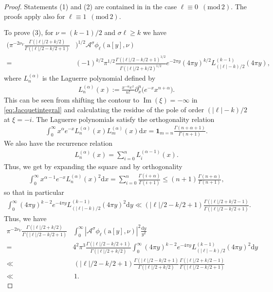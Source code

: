 \documentclass[12pt]{amsart}
\theoremstyle{definition}
\theoremstyle{remark}
\numberwithin{equation}{section}
\newcommand{\1}{{\mathbf 1}}
\renewcommand{\Im}{\operatorname{Im}}
\renewcommand{\d}{\mathrm d}
\renewcommand{\pmod}[1]{\,\,(\mathrm{mod}\,{#1})}
\begin{document}
\begin{proof}
Statements (1) and (2) are contained in \cite[eq. (15.5)]{motohashielements} in the case $\ell \equiv 0 \, \pmod{2}$. The proofs apply also for $\ell \equiv 1 \, \pmod{2}$.





To prove (3), for $\nu=(k-1)/2$ and $\sigma\ell\geq k$ we have
\begin{align*}
 \bigg(\pi^{-2 \nu_V}\frac{\Gamma(|\ell|/2+k/2)}{\Gamma(|\ell|/2-k/2+1)} & \bigg)^{1/2}   \mathcal{A}^\sigma  \phi_{\ell}(\mathrm{a}[y],\nu) \\
 =&  (-1)^{k/2} \pi^{1/2}\frac{\Gamma(|\ell|/2 - k/2 +1)^{1/2}}{\Gamma(|\ell|/2 + k/2)^{1/2}} e^{-2 \pi y} (4 \pi y)^{k/2} L^{(k-1)}_{(|\ell| - k)/2} (4 \pi y),
\end{align*}
where $L^{(\alpha)}_n$ is the Laguerre polynomial \cite[Chapter V (5.1.5)]{szegobook} defined by
\begin{align*}
 L^{(\alpha)}_n(x) :=  \frac{x^{-\alpha} e^{x}}{n!} \partial_{x}^{n} \bigg( e^{-x} x^{n+\alpha} \bigg).
\end{align*}
This can be seen from shifting the contour to $\Im (\xi) = -\infty$ in \eqref{eq:Jacquetintegral} and calculating the residue of the pole of order $(|\ell| - k)/2$ at $\xi = -i$. The Laguerre polynomials satisfy the orthogonality relation \cite[Chapter V, (5.1.1)]{szegobook}
\begin{align*}
    \int_0^\infty x^\alpha e^{-x} L^{(\alpha)}_{n}(x)L^{(\alpha)}_{m}(x) \d x = \mathbf{1}_{m=n} \frac{\Gamma(n+\alpha+1)}{\Gamma(n+1)}.
\end{align*}
We also have the recurrence relation \cite[Chapter V, (5.1.13)]{szegobook}
\begin{align*}
    L_{n}^{(\alpha)}(x) = \sum_{i=0}^{n}  L_{i}^{(\alpha-1)}(x).
\end{align*}
Thus, we get by expanding the square and by orthogonality
\begin{align*}
     \int_0^\infty x^{\alpha-1} e^{-x} L^{(\alpha)}_{n}(x)^2 \d x = \sum_{i=0}^n \frac{\Gamma(i+\alpha)}{\Gamma(i+1)}  \leq (n+1) \frac{\Gamma(n+\alpha)}{\Gamma(n+1)},
\end{align*}
so that in particular
\begin{align*}
        \int_0^\infty (4 \pi y)^{k-2} e^{-4 \pi y} L^{(k-1)}_{(|\ell| - k)/2}(4 \pi y)^2 \d y \ll  (|\ell|/2-k/2 +1 ) \frac{\Gamma(|\ell|/2 +k/2-1)}{\Gamma(|\ell|/2-k/2 +1)}.
\end{align*}
Thus, we have
\begin{align*}
  \pi^{-2 \nu_V}\frac{\Gamma(|\ell|/2+k/2)}{\Gamma(|\ell|/2-k/2+1)}  &\int_0^\infty  |\mathcal{A}^\sigma  \phi_{\ell}(\mathrm{a}[y],\nu) |^2 \frac{\d y}{y^2} \\
  =&  4^2\pi^3  \frac{\Gamma(|\ell|/2-k/2+1)}{\Gamma(|\ell|/2+k/2)} \int_0^\infty (4 \pi y)^{k-2} e^{-4 \pi y} L^{(k-1)}_{(|\ell| - k)/2}(4 \pi y)^2 \d y \\
\ll &\, (|\ell|/2-k/2 +1 )  \frac{\Gamma(|\ell|/2-k/2+1)}{\Gamma(|\ell|/2+k/2)}  \frac{\Gamma(|\ell|/2 +k/2-1)}{\Gamma(|\ell|/2-k/2 +1)} \\
\ll & \, 1.
\end{align*} 
\end{proof}
\end{document}
